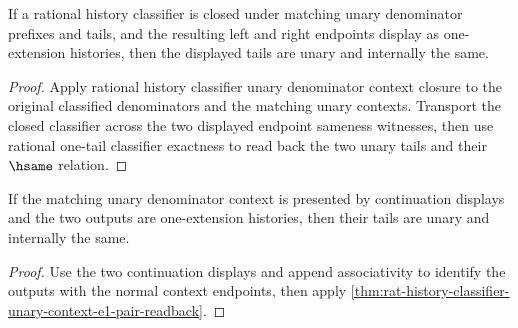 \begin{theorem}
\label{thm:rat-history-classifier-unary-context-e1-pair-readback}
If a rational history classifier is closed under matching unary denominator prefixes and tails, and the resulting left and right endpoints display as one-extension histories, then the displayed tails are unary and internally the same.
\end{theorem}
\begin{proof}
Apply rational history classifier unary denominator context closure to the original classified denominators and the matching unary contexts. Transport the closed classifier across the two displayed endpoint sameness witnesses, then use rational one-tail classifier exactness to read back the two unary tails and their $\hsame$ relation.
\end{proof}

\begin{theorem}
\label{thm:rat-history-classifier-cont-unary-context-e1-pair-readback}
If the matching unary denominator context is presented by continuation
displays and the two outputs are one-extension histories, then their tails are
unary and internally the same.
\end{theorem}
\begin{proof}
Use the two continuation displays and append associativity to identify the
outputs with the normal context endpoints, then apply
\autoref{thm:rat-history-classifier-unary-context-e1-pair-readback}.
\end{proof}
